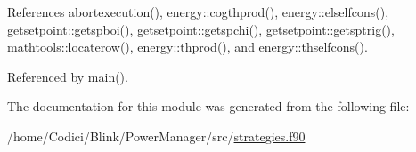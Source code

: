 References abortexecution(), energy\-::cogthprod(), energy\-::elselfcons(), getsetpoint\-::getspboi(), getsetpoint\-::getspchi(), getsetpoint\-::getsptrig(), mathtools\-::locaterow(), energy\-::thprod(), and energy\-::thselfcons().



Referenced by main().



The documentation for this module was generated from the following file\-:\begin{DoxyCompactItemize}
\item 
/home/\-Codici/\-Blink/\-Power\-Manager/src/\hyperlink{strategies_8f90}{strategies.\-f90}\end{DoxyCompactItemize}
